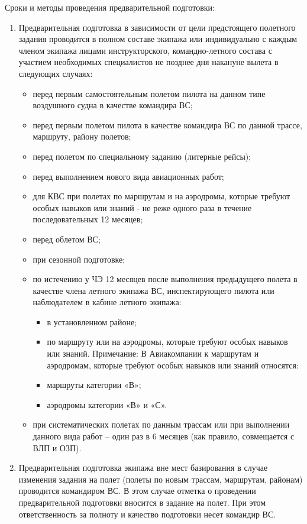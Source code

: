 Сроки и методы проведения предварительной подготовки:
\begin{enumerate}[label=\alph*), ref=\alph*]
\item Предварительная подготовка в зависимости от цели предстоящего полетного задания проводится в полном составе экипажа или индивидуально с каждым членом экипажа лицами инструкторского, командно-летного состава с участием необходимых специалистов не позднее дня накануне вылета в следующих случаях:
    \begin{itemize}    
        \item перед первым самостоятельным полетом пилота на данном типе воздушного судна в качестве командира ВС;
        \item перед первым полетом пилота в качестве командира ВС по данной трассе, маршруту, району полетов; 
        \item перед полетом по специальному заданию (литерные рейсы);
        \item перед выполнением нового вида авиационных работ;
        \item для КВС при полетах по маршрутам и на аэродромы, которые требуют особых навыков или знаний - не реже одного раза в течение последовательных 12 месяцев; 
        \item перед облетом ВС; 
        \item при сезонной подготовке; 
        \item по истечению у ЧЭ 12 месяцев после выполнения предыдущего полета в качестве члена летного экипажа ВС, инспектирующего пилота или наблюдателем в кабине летного экипажа:
        \begin{itemize} 
            \item в установленном районе;
            \item по маршруту или на аэродромы, которые требуют особых навыков или знаний. 
Примечание: В Авиакомпании к маршрутам и аэродромам, которые требуют особых навыков или знаний относятся:
            \item маршруты категории «В»; 
            \item аэродромы категории «В» и «С».
        \end{itemize}
        \item при систематических полетах по данным трассам или при выполнении данного вида работ – один раз в 6 месяцев (как правило, совмещается с ВЛП и ОЗП).
    \end{itemize}
\item Предварительная подготовка экипажа вне мест базирования в случае изменения задания на полет (полеты по новым трассам, маршрутам, районам) проводится командиром ВС. В этом случае отметка о проведении предварительной подготовки вносится в задание на полет. При этом ответственность за полноту и качество подготовки несет командир ВС.
\end{enumerate}

